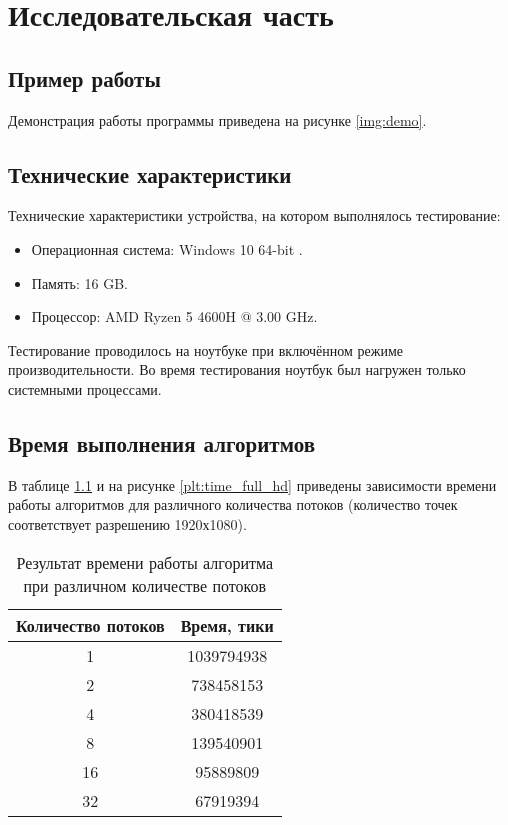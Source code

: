 \chapter{Исследовательская часть}

\section{Пример работы}

Демонстрация работы программы приведена на рисунке \ref{img:demo}.


\section{Технические характеристики}

Технические характеристики устройства, на котором выполнялось тестирование:

\begin{itemize}
	\item Операционная система: Windows 10 64-bit \cite{windows}.
	\item Память: 16 GB.
	\item Процессор: AMD Ryzen 5 4600H \cite{amd} @ 3.00 GHz.
\end{itemize}

Тестирование проводилось на ноутбуке при включённом режиме производительности. Во время тестирования ноутбук был нагружен только системными процессами.

\section{Время выполнения алгоритмов}
 В таблице \ref{tabular:full_hd} и на рисунке \ref{plt:time_full_hd} приведены зависимости времени работы алгоритмов для различного количества потоков (количество точек соответствует разрешению 1920х1080).
 
 \captionsetup{singlelinecheck = false, justification=raggedright}
 \begin{table}[h!]
 	\begin{center}
 		\caption{\label{tabular:full_hd}Результат времени работы алгоритма при различном количестве потоков}
 		\begin{tabular}{|c|c|}
 			\hline
 			Количество потоков & Время, тики \\ 
 			\hline
 			1 & 1039794938  \\\hline
 			2 & 738458153  \\\hline
 			4 & 380418539  \\\hline
 			8 & 139540901  \\\hline
 			16 & 95889809  \\\hline
 			32 & 67919394  \\\hline
 		\end{tabular}
 	\end{center}
 \end{table}
 \captionsetup{singlelinecheck = false, justification=centering}

